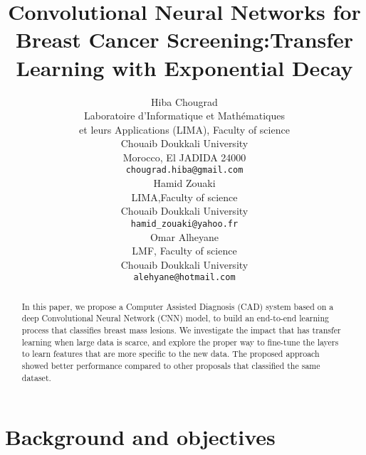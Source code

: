 \documentclass{article}
\title{Convolutional Neural Networks for Breast Cancer Screening:Transfer Learning with Exponential Decay}
\author{
  Hiba Chougrad \\
    Laboratoire d'Informatique et Mathématiques\\ et leurs Applications (LIMA), Faculty of science\\
  Chouaib Doukkali University\\
  Morocco, El JADIDA 24000 \\
  \texttt{chougrad.hiba@gmail.com} \\
   \And
   Hamid Zouaki \\
   LIMA,Faculty of science  \\
   Chouaib Doukkali University\\
   \texttt{hamid\_zouaki@yahoo.fr} \\
   \AND
   Omar Alheyane \\
   LMF, Faculty of science \\
   Chouaib Doukkali University\\
   \texttt{alehyane@hotmail.com} \\
}
\begin{document}

\maketitle

\begin{abstract}
In this paper, we propose a Computer Assisted Diagnosis (CAD) system based on a deep Convolutional Neural Network (CNN) model, to build an end-to-end learning process that classifies breast mass lesions. We investigate the impact that has transfer learning when large data is scarce, and explore the proper way to fine-tune the layers to learn features that are more specific to the new data. The proposed approach showed better performance compared to other proposals that classified the same dataset.
\end{abstract}

\section{Background and objectives}
\end{document}
